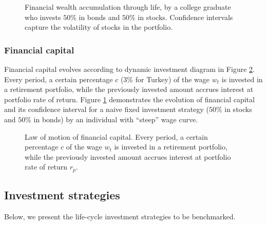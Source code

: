 \documentclass[]{elsarticle}
\begin{document}
\begin{figure}[h!]
\begin{minipage}{0.45\textwidth}
		\caption{Financial wealth accumulation through life, by a college graduate who invests $50\%$ in bonds and $50\%$ in stocks. Confidence intervals capture the volatility of stocks in the portfolio.}
		\label{fig:fincap}
	\end{minipage}
\end{figure}

\subsubsection{Financial capital}

Financial capital evolves according to dynamic investment diagram in Figure \ref{fig:invdiag}. Every period, a certain percentage $c$ ($3\%$ for Turkey) of the wage $w_t$ is invested in a retirement portfolio, while the previously invested amount accrues interest at portfolio rate of return. Figure \ref{fig:fincap} demonstrates the evolution of financial capital and its confidence interval for a naive fixed investment strategy ($50\%$ in stocks and $50\%$ in bonds) by an individual with ``steep'' wage curve.

\begin{figure}[h!]
	\centering
	\caption{Law of motion of financial capital. Every period, a certain percentage $c$ of the wage $w_t$ is invested in a retirement portfolio, while the previously invested amount accrues interest at portfolio rate of return $r_p$.}
	\label{fig:invdiag}
\end{figure}


\subsection{Investment strategies}

Below, we present the life-cycle investment strategies to be benchmarked.
\end{document}
